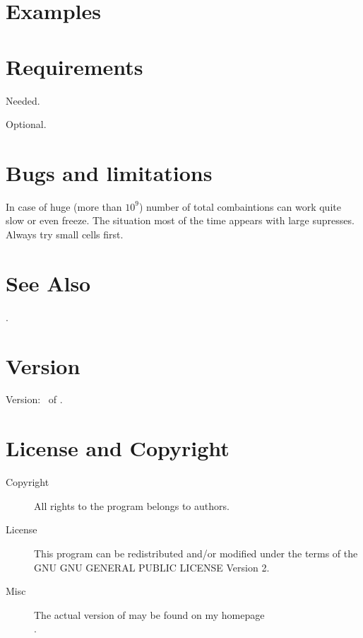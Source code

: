 \documentclass[a4paper,english]{article}
\begin{document}
\section{Examples}


\section{Requirements}

\begin{description}\setlength{\itemsep}{0cm}
\item[openbabel] Needed.
\item[libarchive] Optional. 
\end{description}

\section{Bugs and limitations}

\begin{description}\setlength{\itemsep}{0cm}
\item In case of huge (more than $10^9$) number of total combaintions  can work quite slow or even freeze. The situation most of the time appears with large supresses. Always try small cells first.

\end{description}

\section{See Also}

.


\section{Version}

Version: \Version\ of \Date.

\section{License and Copyright}

\begin{description}
\item[Copyright] 
     All rights to the program belongs to authors.

\item[License] This program can be redistributed and/or modified under the
     terms of the GNU GNU GENERAL PUBLIC LICENSE Version 2.

\item[Misc]
     The actual version of   may be found on my homepage\\
     .

\end{description}
\end{document}
